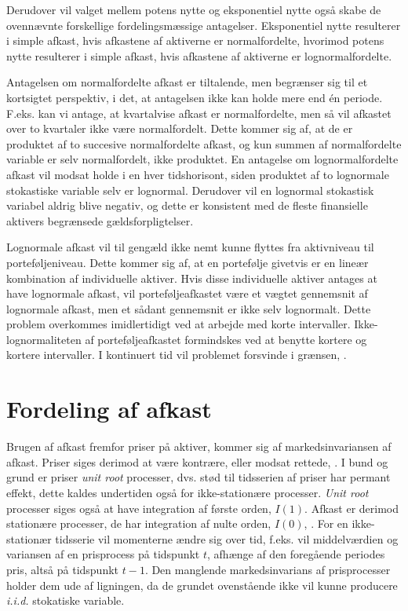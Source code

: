 \documentclass[
  a4paper,
  oneside]{memoir}
\begin{document}
Derudover vil valget mellem potens nytte og eksponentiel nytte også skabe de ovennævnte forskellige fordelingsmæssige antagelser. Eksponentiel nytte resulterer i simple afkast, hvis afkastene af aktiverne er normalfordelte, hvorimod potens nytte resulterer i simple afkast, hvis afkastene af aktiverne er lognormalfordelte.

Antagelsen om normalfordelte afkast er tiltalende, men begrænser sig til et kortsigtet perspektiv, i det, at antagelsen ikke kan holde mere end én periode. F.eks. kan vi antage, at kvartalvise afkast er normalfordelte, men så vil afkastet over to kvartaler ikke være normalfordelt. Dette kommer sig af, at de er produktet af to succesive normalfordelte afkast, og kun summen af normalfordelte variable er selv normalfordelt, ikke produktet. En antagelse om lognormalfordelte afkast vil modsat holde i en hver tidshorisont, siden produktet af to lognormale stokastiske variable selv er lognormal. Derudover vil en lognormal stokastisk variabel aldrig blive negativ, og dette er konsistent med de fleste finansielle aktivers begrænsede gældsforpligtelser.

Lognormale afkast vil til gengæld ikke nemt kunne flyttes fra aktivniveau til porteføljeniveau. Dette kommer sig af, at en portefølje givetvis er en lineær kombination af individuelle aktiver. Hvis disse individuelle aktiver antages at have lognormale afkast, vil porteføljeafkastet være et vægtet gennemsnit af lognormale afkast, men et sådant gennemsnit er ikke selv lognormalt. Dette problem overkommes imidlertidigt ved at arbejde med korte intervaller. Ikke-lognormaliteten af porteføljeafkastet formindskes ved at benytte kortere og kortere intervaller. I kontinuert tid vil problemet forsvinde i grænsen, \citep{CampVic2003}.

\hypertarget{fordafafk}{%
\section{Fordeling af afkast}\label{fordafafk}}

Brugen af afkast fremfor priser på aktiver, kommer sig af markedsinvariansen af afkast. Priser siges derimod at være kontrære, eller modsat rettede, \citep{Jondeau2007}. I bund og grund er priser \emph{unit root} processer, dvs. stød til tidsserien af priser har permant effekt, dette kaldes undertiden også for ikke-stationære processer. \emph{Unit root} processer siges også at have integration af første orden, \(I(1)\). Afkast er derimod stationære processer, de har integration af nulte orden, \(I(0)\), \citep{Verbeek2017}. For en ikke-stationær tidsserie vil momenterne ændre sig over tid, f.eks. vil middelværdien og variansen af en prisprocess på tidspunkt \(t\), afhænge af den foregående periodes pris, altså på tidspunkt \(t-1\). Den manglende markedsinvarians af prisprocesser holder dem ude af ligningen, da de grundet ovenstående ikke vil kunne producere \emph{i.i.d.} stokatiske variable.
\end{document}
